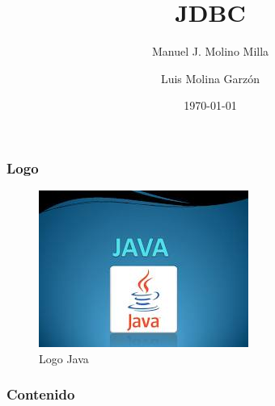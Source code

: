 \documentclass{beamer}
\title{JDBC}
\author{Manuel J. Molino Milla \and Luis Molina Garzón}
\date{\today} %
\institute{IES Virgen del Carmen \and Departamento de Informática}
\begin{document}
\begin{frame}
  \titlepage
\end{frame}

\begin{frame}
    \frametitle{Logo}
\begin{figure}
\includegraphics[scale=1]{imagenes/logo.jpeg} 
\caption{Logo Java}
\end{figure}
\end{frame}

\begin{frame}
  \frametitle{Contenido}
 \tableofcontents[pausesections]
\end{frame}
\end{document}
